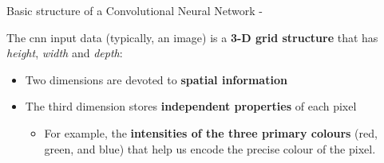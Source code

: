 %
%
%

\begin{frame}[t,allowframebreaks]{Basic structure of a Convolutional Neural Network -}

    The \gls{cnn} 
    input data (typically, an image) is a {\bf 3-D grid structure}
    that has {\it height}, {\it width} and {\it depth}:
    \begin{itemize}
        \item Two dimensions are devoted to {\bf spatial information}
        \item The third dimension stores {\bf independent properties} of each pixel
        \begin{itemize}
            \item For example, the {\bf intensities of the three primary colours}
             (red, green, and blue) that help us encode the precise colour of the pixel.
        \end{itemize}
    \end{itemize}


\end{frame}

